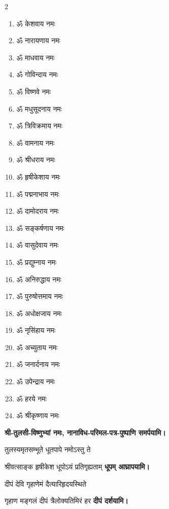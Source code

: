 \begin{center}
\begin{multicols}{2}
\begin{enumerate}
\item ॐ केशवाय नमः
\item ॐ नारायणाय नमः
\item ॐ माधवाय नमः
\item ॐ गोविन्दाय नमः
\item ॐ विष्णवे नमः
\item ॐ मधुसूदनाय नमः
\item ॐ त्रिविक्रमाय नमः
\item ॐ वामनाय नमः
\item ॐ श्रीधराय नमः
\item ॐ हृषीकेशाय नमः
\item ॐ पद्मनाभाय नमः
\item ॐ दामोदराय नमः
\item ॐ सङ्कर्षणाय नमः
\item ॐ वासुदेवाय नमः
\item ॐ प्रद्युम्नाय नमः
\item ॐ अनिरुद्धाय नमः
\item ॐ पुरुषोत्तमाय नमः
\item ॐ अधोक्षजाय नमः
\item ॐ नृसिंहाय नमः
\item ॐ अच्युताय नमः
\item ॐ जनार्दनाय नमः
\item ॐ उपेन्द्राय नमः
\item ॐ हरये नमः
\item ॐ श्रीकृष्णाय नमः
\end{enumerate}
\end{multicols}

\begingroup
\setlength{\columnseprule}{1pt}
\let\chapt\sect


\textbf{श्री-तुलसी-विष्णुभ्यां नमः, नानाविध-परिमल-पत्र-पुष्पाणि समर्पयामि।}
\endgroup


{तुलस्यमृतसम्भूते धूतपापे नमोऽस्तु ते}

{श्रीवत्साङ्क हृषीकेश धूपोऽयं प्रतिगृह्यताम्}
\textbf{\devAya{} धूपम् आघ्रापयामि।}
\medskip

{दीपं देवि गृहाणेमं दैत्यारिहृदयस्थिते}

{गृहाण मङ्गलं दीपं त्रैलोक्यतिमिरं हर}
\textbf{\devAya{} दीपं दर्शयामि।}
\medskip


\end{center}
